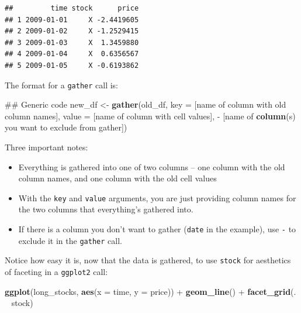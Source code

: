 \documentclass[]{book}
\makeatletter
\newenvironment{Shaded}{\begin{snugshade}}{\end{snugshade}}
\newcommand{\KeywordTok}[1]{\textcolor[rgb]{0.13,0.29,0.53}{\textbf{{#1}}}}
\newcommand{\DataTypeTok}[1]{\textcolor[rgb]{0.13,0.29,0.53}{{#1}}}
\newcommand{\StringTok}[1]{\textcolor[rgb]{0.31,0.60,0.02}{{#1}}}
\newcommand{\NormalTok}[1]{{#1}}
\providecommand{\tightlist}{%
  \setlength{\itemsep}{0pt}\setlength{\parskip}{0pt}}
\newenvironment{kframe}{%
\medskip{}
\setlength{\fboxsep}{.8em}
 \def\at@end@of@kframe{}%
 \ifinner\ifhmode%
  \def\at@end@of@kframe{\end{minipage}}%
  \begin{minipage}{\columnwidth}%
 \fi\fi%
 \def\FrameCommand##1{\hskip\@totalleftmargin \hskip-\fboxsep
 \colorbox{shadecolor}{##1}\hskip-\fboxsep
     \hskip-\linewidth \hskip-\@totalleftmargin \hskip\columnwidth}%
 \MakeFramed {\advance\hsize-\width
   \@totalleftmargin\z@ \linewidth\hsize
   \@setminipage}}%
 {\par\unskip\endMakeFramed%
 \at@end@of@kframe}
\renewenvironment{Shaded}{\begin{kframe}}{\end{kframe}}
\makeatother
\begin{document}
\begin{verbatim}
##         time stock      price
## 1 2009-01-01     X -2.4419605
## 2 2009-01-02     X -1.2529415
## 3 2009-01-03     X  1.3459880
## 4 2009-01-04     X  0.6356567
## 5 2009-01-05     X -0.6193862
\end{verbatim}

The format for a \texttt{gather} call is:

\begin{Shaded}
\begin{Highlighting}[]
\NormalTok{## Generic code}
\NormalTok{new_df <-}\StringTok{ }\KeywordTok{gather}\NormalTok{(old_df,}
                 \DataTypeTok{key =} \NormalTok{[name of column with old column names],}
                 \DataTypeTok{value =} \NormalTok{[name of column with cell values],}
                 \NormalTok{-}\StringTok{ }\NormalTok{[name of }\KeywordTok{column}\NormalTok{(s) you want to }
                    \NormalTok{exclude from gather])}
\end{Highlighting}
\end{Shaded}

Three important notes:

\begin{itemize}
\tightlist
\item
  Everything is gathered into one of two columns -- one column with the
  old column names, and one column with the old cell values
\item
  With the \texttt{key} and \texttt{value} arguments, you are just
  providing column names for the two columns that everything's gathered
  into.
\item
  If there is a column you don't want to gather (\texttt{date} in the
  example), use \texttt{-} to exclude it in the \texttt{gather} call.
\end{itemize}

Notice how easy it is, now that the data is gathered, to use
\texttt{stock} for aesthetics of faceting in a \texttt{ggplot2} call:

\begin{Shaded}
\begin{Highlighting}[]
\KeywordTok{ggplot}\NormalTok{(long_stocks, }\KeywordTok{aes}\NormalTok{(}\DataTypeTok{x =} \NormalTok{time, }\DataTypeTok{y =} \NormalTok{price)) +}\StringTok{ }
\StringTok{  }\KeywordTok{geom_line}\NormalTok{() +}\StringTok{ }
\StringTok{  }\KeywordTok{facet_grid}\NormalTok{(. ~}\StringTok{ }\NormalTok{stock)}
\end{Highlighting}
\end{Shaded}
\end{document}
